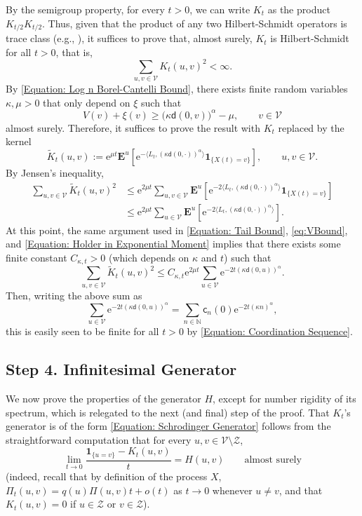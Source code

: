 \documentclass{amsart}
\numberwithin{equation}{section}
\theoremstyle{definition}
\newcommand\al{\alpha}
\newcommand\ka{\kappa}
\newcommand\mbb{\mathbb}
\newcommand\mbf{\mathbf}
\newcommand\mr{\mathrm}
\newcommand\ms{\mathscr}
\newcommand\msf{\mathsf}
\begin{document}
By the semigroup property, for every $t>0$, we can write
$K_t$ as the product $K_{t/2}K_{t/2}$. Thus, given that
the product of any two Hilbert-Schmidt operators is trace class
(e.g., \cite[Theorem 3.7.4]{Simon}),
it suffices to prove that, almost surely, $K_t$ is Hilbert-Schmidt
for all $t>0$, that is,
\[\sum_{u,v\in\ms V}K_t(u,v)^2<\infty.\]
By \eqref{Equation: Log n Borel-Cantelli Bound},
there exists finite random variables $\ka,\mu>0$ that only depend on $\xi$ such that
\[V(v)+\xi(v)\geq\big(\ka\msf d(0,v)\big)^\al-\mu,\qquad v\in\ms V\]
almost surely. Therefore, it suffices to prove the result with $K_t$ replaced by the kernel
\[\tilde K_t(u,v):=\mr e^{\mu t}\mbf E^u\left[\mr e^{-\langle L_t,(\ka\msf d(0,\cdot))^\al\rangle}\mbf 1_{\{X(t)=v\}}\right],\qquad u,v\in\ms V.\]
By Jensen's inequality,
\begin{align*}
\sum_{u,v\in\ms V}\tilde K_t(u,v)^2
&\leq\mr e^{2\mu t}\sum_{u,v\in\ms V}\mbf E^u\left[\mr e^{-2\langle L_t,(\ka\msf d(0,\cdot))^\al\rangle}\mbf 1_{\{X(t)=v\}}\right]\\
&\leq\mr e^{2\mu t}\sum_{u\in\ms V}\mbf E^u\left[\mr e^{-2\langle L_t,(\ka\msf d(0,\cdot))^\al\rangle}\right].
\end{align*}
At this point, the same argument used in \eqref{Equation: Tail Bound}, \eqref{eq:VBound}, and \eqref{Equation: Holder in Exponential Moment}
implies that there exists some finite constant $C_{\ka,t}>0$ (which depends on $\ka$ and $t$) such that
\[\sum_{u,v\in\ms V}\tilde K_t(u,v)^2\leq C_{\ka,t}\mr e^{2\mu t}\sum_{u\in\ms V}\mr e^{-2t(\ka\msf d(0,u))^\al}.\]
Then, writing the above sum as
\[\sum_{u\in\ms V}\mr e^{-2t(\ka\msf d(0,u))^\al}=\sum_{n\in\mbb N}\msf c_n(0)\mr e^{-2t(\ka n)^\al},\]
this is easily seen to be finite for all $t>0$ by \eqref{Equation: Coordination Sequence}.

%

\subsection{Step 4. Infinitesimal Generator}

%

We now prove the properties of the generator $H$,
except for number rigidity of its spectrum, which is relegated to the next (and final) step of the proof.
That $K_t$'s generator
is of the form \eqref{Equation: Schrodinger Generator} follows
from the straightforward computation that for every $u,v\in\ms V\setminus\ms Z$,
\[\lim_{t\to0}\frac{\mbf 1_{\{u=v\}}-K_t(u,v)}{t}=H(u,v)\qquad\text{almost surely}\]
(indeed, recall that by definition of the process $X$, $\Pi_t(u,v)=q(u)\Pi(u,v)t+o(t)$ as $t\to0$
whenever $u\neq v$, and that $K_t(u,v)=0$ if $u\in\ms Z$ or $v\in\ms Z$).
\end{document}
